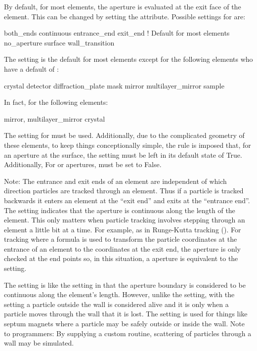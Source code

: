 By default, for most elements, the aperture is evaluated at the exit face of the element. This can
be changed by setting the  attribute.  Possible settings for  are:
\begin{example}
  both_ends
  continuous
  entrance_end
  exit_end       ! Default for most elements
  no_aperture
  surface  
  wall_transition
\end{example}
The  setting is the default for most elements except for
the following elements who have a default of :
\begin{example}
  crystal
  detector
  diffraction_plate
  mask
  mirror
  multilayer_mirror
  sample
\end{example}

In fact, for the following elements:
\begin{example}
  mirror, 
  multilayer_mirror
  crystal
\end{example}
The  setting for  must be used.  Additionally, due to the complicated
geometry of these elements, to keep things conceptionally simple, the rule is imposed that, for an
aperture at the surface, the  setting must be left in its default state of
True. Additionally, For  or  apertures, 
must be set to False.

Note: The entrance and exit ends of an element are independent of which direction particles are
tracked through an element. Thus if a particle is tracked backwards it enters an element at the
``exit end'' and exits at the ``entrance end''. The  setting indicates that the
aperture is continuous along the length of the element. This only matters when particle tracking
involves stepping through an element a little bit at a time. For example, as in Runge-Kutta tracking
(). For tracking where a formula is used to transform the particle coordinates at the
entrance of an element to the coordinates at the exit end, the aperture is only checked at the end
points so, in this situation, a  aperture is equivalent to the 
setting.

The  setting is like the  setting in that the aperture boundary
is considered to be continuous along the element's length. However, unlike the 
setting, with the  setting a particle outside the wall is considered alive and
it is only when a particle moves through the wall that it is lost.  The  setting
is used for things like septum magnets where a particle may be safely outside or inside the
wall. Note to programmers: By supplying a custom  routine, scattering of
particles through a wall may be simulated.

